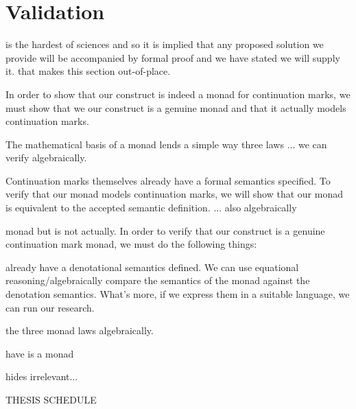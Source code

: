 \documentclass[ms]{byuprop}
\begin{document}
\section{Validation}

is the hardest of sciences and so it is implied that any proposed solution we provide will
be accompanied by formal proof and we have stated we will supply it. that makes this
section out-of-place.

In order to show that our construct is indeed a monad for continuation marks, we must show
that we our construct is a genuine monad and that it actually models continuation marks.

The mathematical basis of a monad lends a simple way three laws ... we can verify
algebraically.

Continuation marks themselves already have a formal semantics specified. To verify that
our monad models continuation marks, we will show that our monad is equivalent to the
accepted semantic definition. ... also algebraically


monad but is not actually. In order to verify that our construct is a genuine continuation
mark monad, we must do the following things:

already have a denotational semantics defined. We can use equational
reasoning/algebraically compare the semantics of the monad against the denotation
semantics. What's more, if we express them in a suitable language, we can run our
research.

the three monad laws algebraically.

have is a monad

hides irrelevant...







THESIS SCHEDULE





\end{document}
